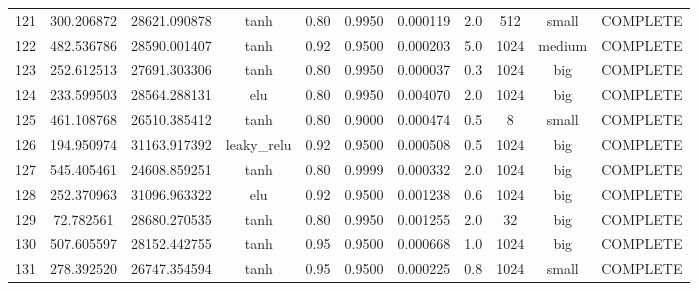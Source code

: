 \begin{longtable}{ccccccccccc}
                      121 &                 300.206872 &                       28621.090878 &            tanh &        0.80 & 0.9950 &       0.000119 &             2.0 &      512 &     small & COMPLETE \\
                      122 &                 482.536786 &                       28590.001407 &            tanh &        0.92 & 0.9500 &       0.000203 &             5.0 &     1024 &    medium & COMPLETE \\
                      123 &                 252.612513 &                       27691.303306 &            tanh &        0.80 & 0.9950 &       0.000037 &             0.3 &     1024 &       big & COMPLETE \\
                      124 &                 233.599503 &                       28564.288131 &             elu &        0.80 & 0.9950 &       0.004070 &             2.0 &     1024 &       big & COMPLETE \\
                      125 &                 461.108768 &                       26510.385412 &            tanh &        0.80 & 0.9000 &       0.000474 &             0.5 &        8 &     small & COMPLETE \\
                      126 &                 194.950974 &                       31163.917392 &     leaky\_relu &        0.92 & 0.9500 &       0.000508 &             0.5 &     1024 &       big & COMPLETE \\
                      127 &                 545.405461 &                       24608.859251 &            tanh &        0.80 & 0.9999 &       0.000332 &             2.0 &     1024 &       big & COMPLETE \\
                      128 &                 252.370963 &                       31096.963322 &             elu &        0.92 & 0.9500 &       0.001238 &             0.6 &     1024 &       big & COMPLETE \\
                      129 &                  72.782561 &                       28680.270535 &            tanh &        0.80 & 0.9950 &       0.001255 &             2.0 &       32 &       big & COMPLETE \\
                      130 &                 507.605597 &                       28152.442755 &            tanh &        0.95 & 0.9500 &       0.000668 &             1.0 &     1024 &       big & COMPLETE \\
                      131 &                 278.392520 &                       26747.354594 &            tanh &        0.95 & 0.9500 &       0.000225 &             0.8 &     1024 &     small & COMPLETE \\

\end{longtable}
